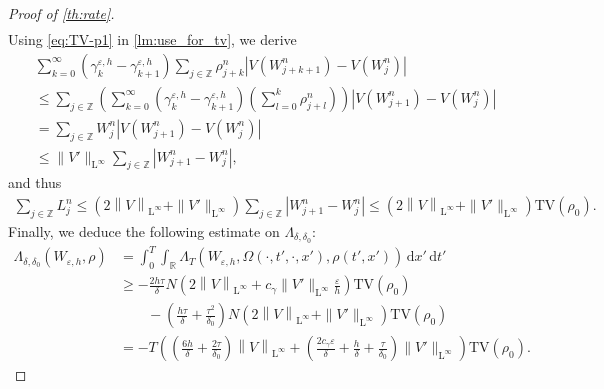 \documentclass[10pt]{amsart}
\theoremstyle{plain}
\theoremstyle{definition}
\numberwithin{equation}{section}
\newcommand{\eps}{{\varepsilon}}
\newcommand{\norm}[1]{\left\lVert#1\right\rVert}
\newcommand{\dt}{{\, \mathrm{d}t}}
\newcommand{\dx}{{\, \mathrm{d}x}}
\begin{document}
\begin{proof}[Proof of \cref{th:rate}]
\begin{align*}
\end{align*}
Using \cref{eq:TV-p1} in \cref{lm:use_for_tv}, we derive
\begin{align*}
    &\sum_{k=0}^\infty (\gamma_k^{\eps,h}-\gamma_{k+1}^{\eps,h}) \sum_{j\in\mathbb{Z}} \rho_{j+k}^n \left| V(W_{j+k+1}^n) - V(W_j^n) \right| \\
    &\leq \sum_{j\in\mathbb{Z}} \left( \sum_{k=0}^\infty \left(\gamma_k^{\eps,h}-\gamma_{k+1}^{\eps,h}\right) \left(\sum_{l=0}^k \rho_{j+l}^n\right) \right) \left|V(W_{j+1}^n) -V(W_j^n)\right| \\
    &= \sum_{j\in\mathbb{Z}} W_j^n \left|V(W_{j+1}^n) -V(W_j^n)\right| \\
    &\leq \|V'\|_{\mathrm{L}^\infty} \sum_{j\in\mathbb{Z}} |W_{j+1}^n-W_j^n|,
\end{align*}
and thus
\begin{align*}
    \sum_{j\in\mathbb{Z}} L_j^n \leq \left( 2\norm{V}_{\mathrm{L}^{\infty}} + \|V'\|_{\mathrm{L}^\infty} \right) \sum_{j\in\mathbb{Z}} |W_{j+1}^n-W_j^n| \leq \left( 2\norm{V}_{\mathrm{L}^{\infty}} + \|V'\|_{\mathrm{L}^\infty} \right) \mathrm{TV}(\rho_0) .
\end{align*}
Finally, we deduce the following estimate on $\Lambda_{\delta,\delta_0}$:
\begin{align*}
    \Lambda_{\delta,\delta_0}(W_{\eps,h},\rho) &= \int_0^T\int_{\mathbb{R}} \Lambda_T(W_{\eps,h}, \Omega(\cdot,t',\cdot,x'),\rho(t',x')) \dx'\dt' \\
    &\geq -\frac{2h\tau}{\delta} N \left( 2\norm{V}_{\mathrm{L}^{\infty}} + c_\gamma \|V'\|_{\mathrm{L}^\infty} \frac{\eps}h \right) \mathrm{TV}(\rho_0) \\
    &\qquad - \left( \frac{h\tau}{\delta} + \frac{\tau^2}{\delta_0} \right) N \left( 2\norm{V}_{\mathrm{L}^{\infty}} + \|V'\|_{\mathrm{L}^\infty} \right) \mathrm{TV}(\rho_0) \\
    &= - T \left( \left(\frac{6h}{\delta}+\frac{2\tau}{\delta_0}\right) \norm{V}_{\mathrm{L}^{\infty}} + \left(\frac{2c_\gamma\eps}{\delta}+\frac{h}{\delta}+\frac{\tau}{\delta_0}\right)\|V'\|_{\mathrm{L}^\infty}\right) \mathrm{TV}(\rho_0).
\end{align*}


\end{proof}
\end{document}
